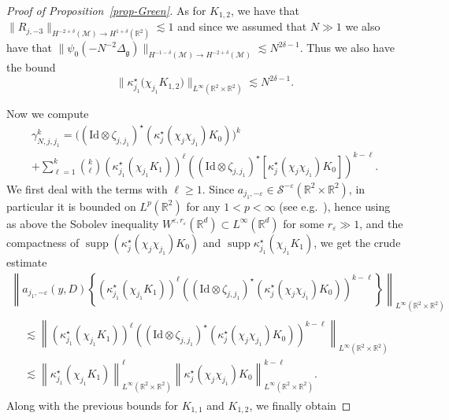 \documentclass[10pt]{amsart}
\theoremstyle{definition}\newtheorem{defi}[theo]{Definition}\newtheorem{rema}[theo]{Remark}\newtheorem{exam}[theo]{Example}\newtheorem{exem}[theo]{Example}\newtheorem{nota}[theo]{Notation}
\newcommand{\R}{\mathbb{R}}
\DeclareMathOperator*{\supp}{supp}
\renewcommand{\S}{\mathcal{S}}
\newcommand{\M}{\mathcal{M}}
\newcommand{\Id}{\mathrm{Id}}
\newcommand{\g}{\mathfrak{g}}
\newcommand{\dl}{\delta}
\newcommand{\Dlg}{\Delta_{\g}}
\newcommand{\eps}{\varepsilon}
\newcommand{\kk}{\kappa}
\newcommand{\les}{\lesssim}
\begin{document}
\begin{proof}[Proof of Proposition~\ref{prop-Green}]
As for $K_{1,2}$, we have that $\|R_{j,-3}\|_{H^{-2+\dl}(\M)\to H^{1+\dl}(\R^2)}\les 1$ and since we assumed that $N\gg 1$ we also have that $\|\psi_0(-N^{-2}\Dlg)\|_{H^{-1-\dl}(\M)\to H^{-2+\dl}(\M)}\les N^{2\dl-1}$. Thus we also have the bound
\begin{equation*}
\big\|\kk_{j_1}^{\star}\big(\chi_{j_1}K_{1,2}\big)\big\|_{L^{\infty}(\R^2\times\R^2)}\les N^{2\dl-1}.
\end{equation*}

Now we compute
\begin{multline*}
\gamma_{N,j,j_1}^k = \Big(\left(\Id\otimes\zeta_{j,j_1}\right)^{\star}\left(\kk_j^{\star}\left(\chi_j\chi_{j_1}\right)K_0\right)\Big)^k\\
+\sum_{\ell=1}^k{\binom k \ell}\left(\kk_{j_1}^{\star}\left(\chi_{j_1}K_1\right)\right)^{\ell}\left(\left(\Id\otimes\zeta_{j,j_1}\right)^{\star}\left[\kk_j^\star\left(\chi_j\chi_{j_1}\right)K_0\right]\right)^{k-\ell}.
\end{multline*}
We first deal with the terms with $\ell \ge 1$. Since $a_{j_1,-\eps}\in\S^{-\eps}(\R^2\times\R^2)$, in particular it is bounded on $L^p(\R^2)$ for any $1<p<\infty$ (see e.g.~\cite{F}), hence using as above the Sobolev inequality $W^{\eps,r_{\eps}}(\R^d)\subset L^\infty(\R^d)$ for some $r_\eps\gg1$, and the compactness of $\supp (\kk_j^{\star}(\chi_j\chi_{j_1})K_0)$ and $\supp \kk_{j_1}^{\star}(\chi_{j_1}K_1)$, we get the crude estimate
\begin{multline*}
\left\| a_{j_1,-\eps}(y,D)\left\{\left(\kk_{j_1}^{\star}\left(\chi_{j_1}K_1\right)\right)^{\ell}\left(\left(\Id\otimes\zeta_{j,j_1}\right)^{\star}\left(\kk_j^{\star}\left(\chi_j\chi_{j_1}\right)K_0\right)\right)^{k-\ell}\right\}\right\|_{L^{\infty}\left(\R^2\times\R^2\right)}\\
\begin{aligned}
&\les \left\|\left(\kk_{j_1}^{\star}\left(\chi_{j_1}K_1\right)\right)^{\ell}\left(\left(\Id\otimes\zeta_{j,j_1}\right)^{\star}\left(\kk_j^{\star}\left(\chi_j\chi_{j_1}\right)K_0\right)\right)^{k-\ell}\right\|_{L^{\infty}\left(\R^2\times\R^2\right)}\\
&\les \left\|\kk_{j_1}^{\star}\left(\chi_{j_1}K_1\right)\right\|_{L^{\infty}\left(\R^2\times\R^2\right)}^{\ell}\left\|\kk_j^{\star}\left(\chi_j\chi_{j_1}\right)K_0\right\|_{L^{\infty}\left(\R^2\times\R^2\right)}^{k-\ell}.
\end{aligned}
\end{multline*}
Along with the previous bounds for $K_{1,1}$ and $K_{1,2}$, we finally obtain

\end{proof}
\end{document}
